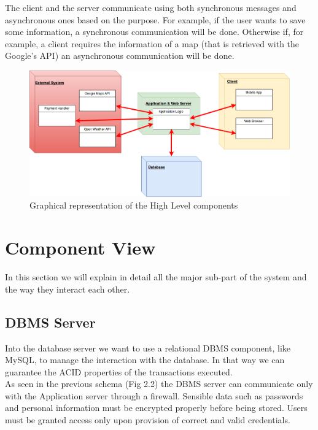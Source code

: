 \documentclass[numbers=noenddot, 12pt, a4paper, oneside]{scrbook}
\begin{document}
The client and the server communicate using both synchronous messages and asynchronous ones based on the purpose. For example, if the user wants to save some information, a synchronous communication will be done. Otherwise if, for example, a client requires the information of a map (that is retrieved with the Google's API) an asynchronous communication will be done.\\

\begin{figure}[H]
	\centering
	\includegraphics[width=1.1\textwidth]{images/HighLevelComponent}
	\caption{Graphical representation of the High Level components}
\end{figure}

\section{Component View}

In this section we will explain in detail all the major sub-part of the system and the way they interact each other.

\subsection*{DBMS Server}

Into the database server we want to use a relational DBMS component, like MySQL, to manage the interaction with the database. In that way we can guarantee the ACID properties of the transactions executed.\\

As seen in the previous schema (Fig 2.2) the DBMS server can communicate only with the Application server through a firewall. Sensible data such as passwords and personal information must be encrypted properly before being stored. Users must be granted access only upon provision of correct and valid credentials.\\
\end{document}
